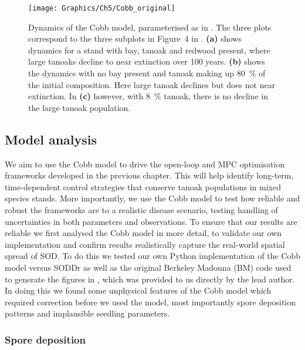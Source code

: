 \begin{figure}[t]
    \begin{center}
        \texttt{[image: Graphics/Ch5/Cobb\_original]}
        \caption[Mixed stand model baseline dynamics]{Dynamics of the Cobb model, parameterised as in \citet{cobb_ecosystem_2012}. The three plots correspond to the three subplots in Figure~4 in \citet{cobb_ecosystem_2012}. \textbf{(a)} shows dynamics for a stand with bay, tanoak and redwood present, where large tanoaks decline to near extinction over 100 years. \textbf{(b)} shows the dynamics with no bay present and tanoak making up \SI{80}{\percent} of the initial composition. Here large tanoak declines but does not near extinction. In \textbf{(c)} however, with \SI{8}{\percent} tanoak, there is no decline in the large tanoak population.\label{fig:ch5:cobb_host_change}}
    \end{center}
\end{figure}

\subsection{Model analysis\label{sec:ch5:model_analysis}}

We aim to use the Cobb model to drive the open-loop and MPC optimisation frameworks developed in the previous chapter. This will help identify long-term, time-dependent control strategies that conserve tanoak populations in mixed species stands. More importantly, we use the Cobb model to test how reliable and robust the frameworks are to a realistic disease scenario, testing handling of uncertainties in both parameters and observations. To ensure that our results are reliable we first analysed the Cobb model in more detail, to validate our own implementation and confirm results realistically capture the real-world spatial spread of SOD\@. To do this we tested our own Python implementation of the Cobb model versus SODDr as well as the original Berkeley Madonna (BM) code used to generate the figures in \citet{cobb_ecosystem_2012}, which was provided to us directly by the lead author. In doing this we found some unphysical features of the Cobb model which required correction before we used the model, most importantly spore deposition patterns and implausible seedling parameters.

\subsubsection{Spore deposition}

